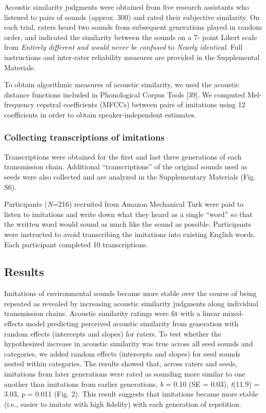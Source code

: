 \documentclass[english,floatsintext,man]{apa6}
\theoremstyle{definition}
\theoremstyle{definition}
\theoremstyle{definition}
\theoremstyle{remark}
\begin{document}
Acoustic similarity judgments were obtained from five research
assistants who listened to pairs of sounds (approx. 300) and rated their
subjective similarity. On each trial, raters heard two sounds from
subsequent generations played in random order, and indicated the
similarity between the sounds on a 7- point Likert scale from
\emph{Entirely different and would never be confused} to \emph{Nearly
identical}. Full instructions and inter-rater reliability measures are
provided in the Supplemental Materials.

To obtain algorithmic measures of acoustic similarity, we used the
acoustic distance functions included in Phonological Corpus Tools
{[}39{]}. We computed Mel-frequency cepstral coefficients (MFCCs)
between pairs of imitations using 12 coefficients in order to obtain
speaker-independent estimates.

\hypertarget{collecting-transcriptions-of-imitations}{%
\subsubsection{Collecting transcriptions of
imitations}\label{collecting-transcriptions-of-imitations}}

Transcriptions were obtained for the first and last three generations of
each transmission chain. Additional \enquote{transcriptions} of the
original sounds used as seeds were also collected and are analyzed in
the Supplementary Materials (Fig. S6).

Participants (\emph{N}=216) recruited from Amazon Mechanical Turk were
paid to listen to imitations and write down what they heard as a single
\enquote{word} so that the written word would sound as much like the
sound as possible. Participants were instructed to avoid transcribing
the imitations into existing English words. Each participant completed
10 transcriptions.

\hypertarget{results}{%
\subsection{Results}\label{results}}

Imitations of environmental sounds became more stable over the course of
being repeated as revealed by increasing acoustic similarity judgments
along individual transmission chains. Acoustic similarity ratings were
fit with a linear mixed-effects model predicting perceived acoustic
similarity from generation with random effects (intercepts and slopes)
for raters. To test whether the hypothesized increase in acoustic
similarity was true across all seed sounds and categories, we added
random effects (intercepts and slopes) for seed sounds nested within
categories. The results showed that, across raters and seeds, imitations
from later generations were rated as sounding more similar to one
another than imitations from earlier generations, \emph{b} = 0.10 (SE =
0.03), \emph{t}(11.9) = 3.03, \emph{p} = 0.011 (Fig. 2). This result
suggests that imitations became more stable (i.e., easier to imitate
with high fidelity) with each generation of repetition.
\end{document}

